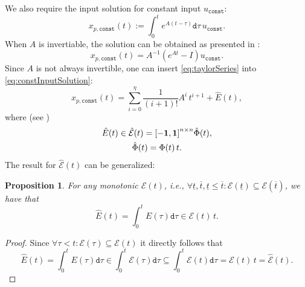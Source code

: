 \documentclass{amsproc}
\newtheorem{proposition}{Proposition}[section]
\renewcommand{\^}[1]{^{(#1)}}
\begin{document}
We also require the input solution for constant input $u_{\mathtt{const}}$:
\begin{equation*}
  x_{p,\mathtt{const}}(t) :=  \int_{0}^{t} e^{A (t - \tau)} \mathtt{d}\tau \, u_{\mathtt{const}}.
\end{equation*}
When $A$ is invertiable, the solution can be obtained as presented in \cite[eq.~(3.6)]{Althoff2010a}:
\begin{equation} \label{eq:constInputSolution}
  x_{p,\mathtt{const}}(t) =  A^{-1} (e^{A t} - I) u_{\mathtt{const}}.
\end{equation}
Since $A$ is not always invertible, one can insert \eqref{eq:taylorSeries} into \eqref{eq:constInputSolution}:
\begin{equation} \label{eq:constInputSolution_Taylor}
  x_{p,\mathtt{const}}(t) =  \sum_{i=0}^{\eta} \frac{1}{(i+1)!}A^i \, t^{i+1} + \hat{E}(t),
\end{equation}
where (see \cite[Appendix~A.1]{Althoff2010a})
\begin{gather}\label{eq:matrixExponentialRemainderIntegrated_thesis}
 \hat{E}(t) \in \hat{\mathcal{E}}(t)  = \mathbf{[-1,1]}^{n \times n} \hat{\Phi}(t), \\
 \hat{\Phi}(t) = \Phi(t) \, t. \notag
\end{gather}
The result for $\hat{\mathcal{E}}(t)$ can be generalized:
\begin{proposition}
 For any monotonic $\mathcal{E}(t)$, i.e., $\forall \underline{t}, \overline{t}, \underline{t} \leq \overline{t}: \mathcal{E}(\underline{t}) \subseteq \mathcal{E}(\overline{t})$, we have that
 \begin{equation*}
  \hat{E}(t) = \int_{0}^{t} E(\tau) \mathtt{d}\tau \in \mathcal{E}(t) \, t.
 \end{equation*}
\end{proposition}
\begin{proof}
 Since $\forall \tau < t: \mathcal{E}(\tau) \subseteq \mathcal{E}(t)$ it directly follows that 
 \begin{equation*}
  \hat{E}(t) = \int_{0}^{t} E(\tau) \mathtt{d}\tau \in \int_{0}^{t} \mathcal{E}(\tau) \mathtt{d}\tau \subseteq \int_{0}^{t} \mathcal{E}(t) \mathtt{d}\tau = \mathcal{E}(t) \, t = \hat{\mathcal{E}}(t).
 \end{equation*}
\end{proof}
\end{document}
